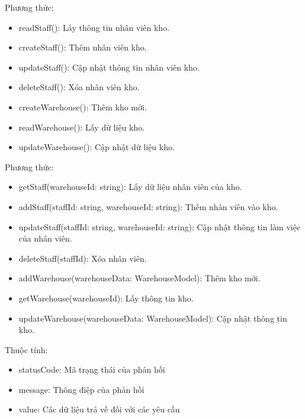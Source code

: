 Phương thức:
\begin{itemize}
	\item readStaff(): Lấy thông tin nhân viên kho.
	\item createStaff(): Thêm nhân viên kho.
	\item updateStaff(): Cập nhật thông tin nhân viên kho.
	\item deleteStaff(): Xóa nhân viên kho.
	\item createWarehouse(): Thêm kho mới.
	\item readWarehouse(): Lấy dữ liệu kho.
	\item updateWarehouse(): Cập nhật dữ liệu kho.
\end{itemize}

Phương thức:
\begin{itemize}
	\item getStaff(warehouseId: string): Lấy dữ liệu nhân viên của kho.
	\item addStaff(staffId: string, warehouseId: string): Thêm nhân viên vào kho.
	\item updateStaff(staffId: string, warehouseId: string): Cập nhật thông tin làm việc của nhân viên.
	\item deleteStaff(staffId): Xóa nhân viên.
	\item addWarehouse(warehouseData: WarehouseModel): Thêm kho mới.
	\item getWarehouse(warehouseId): Lấy thông tin kho.
	\item updateWarehouse(warehouseData: WarehouseModel): Cập nhật thông tin kho.

\end{itemize}

Thuộc tính:
\begin{itemize}
	\item statusCode: Mã trạng thái của phản hồi
	\item message: Thông điệp của phản hồi
	\item value: Các dữ liệu trả về đối với các yêu cầu
\end{itemize}

\newpage



